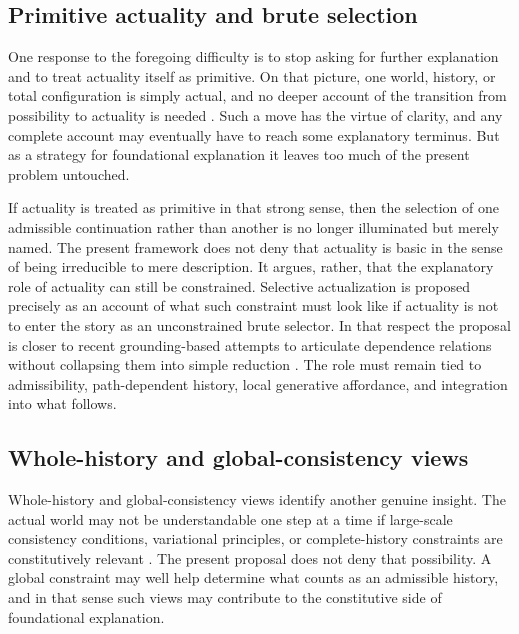 \documentclass[11pt]{article}
\theoremstyle{foundation}
\begin{document}
\subsection{Primitive actuality and brute selection}

One response to the foregoing difficulty is to stop asking for further explanation and to treat actuality itself as primitive. On that picture, one world, history, or total configuration is simply actual, and no deeper account of the transition from possibility to actuality is needed \citep{Lewis1986,Plantinga1974}. Such a move has the virtue of clarity, and any complete account may eventually have to reach some explanatory terminus. But as a strategy for foundational explanation it leaves too much of the present problem untouched.

If actuality is treated as primitive in that strong sense, then the selection of one admissible continuation rather than another is no longer illuminated but merely named. The present framework does not deny that actuality is basic in the sense of being irreducible to mere description. It argues, rather, that the explanatory role of actuality can still be constrained. Selective actualization is proposed precisely as an account of what such constraint must look like if actuality is not to enter the story as an unconstrained brute selector. In that respect the proposal is closer to recent grounding-based attempts to articulate dependence relations without collapsing them into simple reduction \citep{Fine2012,Schaffer2009,Rosen2010}. The role must remain tied to admissibility, path-dependent history, local generative affordance, and integration into what follows.

\subsection{Whole-history and global-consistency views}

Whole-history and global-consistency views identify another genuine insight. The actual world may not be understandable one step at a time if large-scale consistency conditions, variational principles, or complete-history constraints are constitutively relevant \citep{Price1996,WheelerFeynman1945,WheelerFeynman1949,Cartwright1999}. The present proposal does not deny that possibility. A global constraint may well help determine what counts as an admissible history, and in that sense such views may contribute to the constitutive side of foundational explanation.
\end{document}
